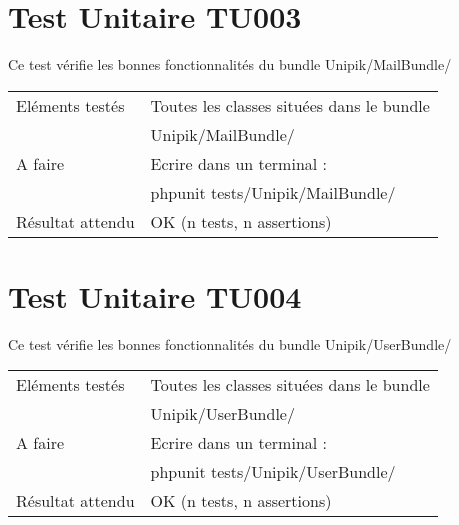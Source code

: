 \section{Test Unitaire TU003}
	
	Ce test vérifie les bonnes fonctionnalités du bundle Unipik/MailBundle/ \\
				
  	\begin{center}
  		\begin{tabular}[h]{|p{}|p{}|}
		\hline
			Eléments testés & Toutes les classes situées dans le bundle \\ 																& Unipik/MailBundle/ \\\hline
    			A faire & Ecrire dans un terminal : \\ 
    					& phpunit tests/Unipik/MailBundle/\\\hline
    			Résultat attendu & OK (n tests, n assertions) \\\hline
     	\end{tabular}
  	\end{center}	
   		
   		
\section{Test Unitaire TU004}
	
	Ce test vérifie les bonnes fonctionnalités du bundle Unipik/UserBundle/ \\
				
  	\begin{center}
  		\begin{tabular}[h]{|p{}|p{}|}
		\hline
			Eléments testés & Toutes les classes situées dans le bundle \\ 																& Unipik/UserBundle/ \\\hline
    			A faire & Ecrire dans un terminal : \\ 
    					& phpunit tests/Unipik/UserBundle/\\\hline
    			Résultat attendu & OK (n tests, n assertions) \\\hline
     	\end{tabular}
  	\end{center}	 	
